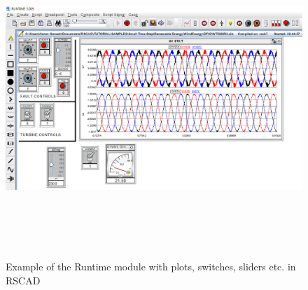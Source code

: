 \begin{figure}[H]
\centering
    \includegraphics[height = 12cm,width = \textwidth]{Diagrams/Chapter_3/Runtime_pic.PNG}
    \caption{Example of the Runtime module with plots, switches, sliders etc. in RSCAD}
    \label{fig:Runtime_RSCAD}
\end{figure}



